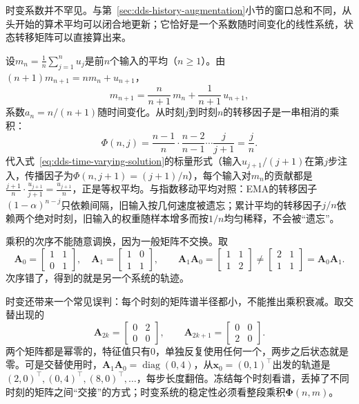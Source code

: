 时变系数并不罕见。与第~\ref{sec:dds-history-augmentation}小节的窗口总和不同，从头开始的算术平均可以闭合地更新；它恰好是一个系数随时间变化的线性系统，状态转移矩阵可以直接算出来。

\begin{example}[累计平均作为时变线性系统]
\label{ex:dds-running-mean}
设$m_n=\frac1n\sum_{j=1}^nu_j$是前$n$个输入的平均（$n\geq1$）。由$(n+1)m_{n+1}=nm_n+u_{n+1}$，
\[
  m_{n+1}=\frac{n}{n+1}\,m_n+\frac1{n+1}\,u_{n+1},
\]
系数$a_n=n/(n+1)$随时间变化。从时刻$j$到时刻$n$的转移因子是一串相消的乘积：
\[
  \Phi(n,j)=\frac{n-1}{n}\cdot\frac{n-2}{n-1}\cdots\frac{j}{j+1}=\frac jn .
\]
代入式~\eqref{eq:dds-time-varying-solution}的标量形式（输入$u_{j+1}/(j+1)$在第$j$步注入，传播因子为$\Phi(n,j+1)=(j+1)/n$），每个输入对$m_n$的贡献都是$\frac{j+1}{n}\cdot\frac{u_{j+1}}{j+1}=\frac{u_{j+1}}n$，正是等权平均。与指数移动平均对照：EMA的转移因子$(1-\alpha)^{n-j}$只依赖间隔，旧输入按几何速度被遗忘；累计平均的转移因子$j/n$依赖两个绝对时刻，旧输入的权重随样本增多而按$1/n$均匀稀释，不会被“遗忘”。
\end{example}

乘积的次序不能随意调换，因为一般矩阵不交换。取
\[
  \bm A_0=\begin{bmatrix}1&1\\0&1\end{bmatrix},\quad
  \bm A_1=\begin{bmatrix}1&0\\1&1\end{bmatrix},\qquad
  \bm A_1\bm A_0=\begin{bmatrix}1&1\\1&2\end{bmatrix}\neq
  \begin{bmatrix}2&1\\1&1\end{bmatrix}=\bm A_0\bm A_1 .
\]
次序错了，得到的就是另一个系统的轨迹。

时变还带来一个常见误判：每个时刻的矩阵谱半径都小，不能推出乘积衰减。取交替出现的
\[
  \bm A_{2k}=\begin{bmatrix}0&2\\0&0\end{bmatrix},\qquad
  \bm A_{2k+1}=\begin{bmatrix}0&0\\2&0\end{bmatrix}.
\]
两个矩阵都是幂零的，特征值只有$0$，单独反复使用任何一个，两步之后状态就是零。可是交替使用时，$\bm A_1\bm A_0=\operatorname{diag}(0,4)$，从$\bm x_0=(0,1)^{\top}$出发的轨道是$(2,0)^{\top},(0,4)^{\top},(8,0)^{\top},\ldots$，每步长度翻倍。冻结每个时刻看谱，丢掉了不同时刻的矩阵之间“交接”的方式；时变系统的稳定性必须看整段乘积$\bm\Phi(n,m)$。

